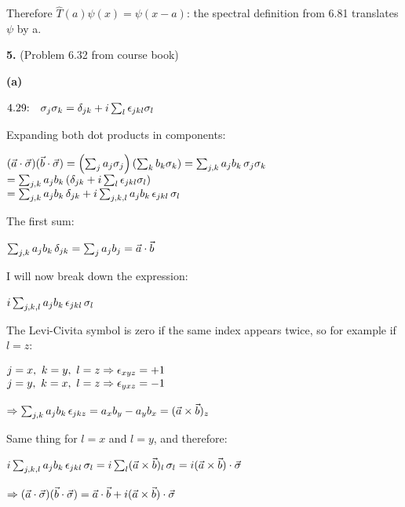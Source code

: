 \documentclass[14pt]{extarticle}
\makeatletter
\newenvironment{lefteqs}{%
    \begin{flushleft}%
    \renewcommand{\arraystretch}{1.3}%
    $\begin{array}{@{}l@{}}%
}{%
    \end{array}$%
    \end{flushleft}%
}
\makeatother
\begin{document}
Therefore $\hat{T}(a)\psi(x) = \psi(x-a)$: the spectral definition from 6.81 translates $\psi$ by a.

\newpage

\textbf{\large 5.}
(Problem 6.32 from course book)

\textbf{(a)}

\begin{lefteqs}
    \text{4.29:} \quad \sigma_j \sigma_k = \delta_{jk} + i \sum_l \epsilon_{jkl} \sigma_l
\end{lefteqs}
Expanding both dot products in components:
\begin{lefteqs}
    (\vec{a} \cdot \vec{\sigma})(\vec{b} \cdot \vec{\sigma}) = \left( \sum_j a_j \sigma_j \right) \left( \sum_k b_k \sigma_k \right) = \sum_{j,k} a_j b_k \, \sigma_j \sigma_k \\
    = \sum_{j,k} a_j b_k \left( \delta_{jk} + i \sum_l \epsilon_{jkl} \sigma_l \right) \\
    = \sum_{j,k} a_j b_k \, \delta_{jk} + i \sum_{j,k,l} a_j b_k \, \epsilon_{jkl} \, \sigma_l
\end{lefteqs}

The first sum:

\begin{lefteqs}
    \sum_{j,k} a_j b_k \, \delta_{jk} = \sum_j a_j b_j = \vec{a} \cdot \vec{b}
\end{lefteqs}

I will now break down the expression:
\begin{lefteqs}
    i \sum_{j,k,l} a_j b_k \, \epsilon_{jkl} \, \sigma_l
\end{lefteqs}
The Levi-Civita symbol is zero if the same index appears twice, so for example if $l = z$:
\begin{lefteqs}
    j = x,\ k = y,\ l = z \Rightarrow \epsilon_{xyz} = +1 \\
    j = y,\ k = x,\ l = z \Rightarrow \epsilon_{yxz} = -1
\end{lefteqs}
\begin{lefteqs}
    \Rightarrow \sum_{j,k} a_j b_k \, \epsilon_{jkz} = a_x b_y - a_y b_x = (\vec{a} \times \vec{b})_z
\end{lefteqs}
Same thing for $l = x$ and $l = y$, and therefore:
\begin{lefteqs}
    i \sum_{j,k,l} a_j b_k \, \epsilon_{jkl} \, \sigma_l = i \sum_l (\vec{a} \times \vec{b})_l \, \sigma_l = i (\vec{a} \times \vec{b}) \cdot \vec{\sigma}
\end{lefteqs}
\begin{lefteqs}
    \Rightarrow (\vec{a} \cdot \vec{\sigma})(\vec{b} \cdot \vec{\sigma}) = \vec{a} \cdot \vec{b} + i (\vec{a} \times \vec{b}) \cdot \vec{\sigma}
\end{lefteqs}
\end{document}
